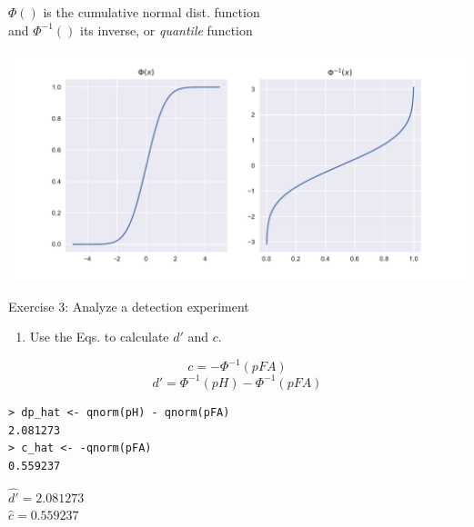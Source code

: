 \documentclass[10pt]{beamer}
\begin{document}
\begin{frame}{}
$\Phi()$ is the cumulative normal dist. function\\
and $\Phi^{-1}()$ its inverse, or \textit{quantile} function


\begin{center}
\includegraphics[scale=0.5]{figs/linkfun.pdf}
\end{center}
\end{frame}

\begin{frame}[fragile]{Exercise 3: Analyze a detection experiment}
\begin{enumerate}
\item Use the Eqs. to calculate $d'$ and $c$.
\end{enumerate}

\begin{block}{}
\begin{equation*}
c = -\Phi^{-1}(pFA)
\end{equation*}
\begin{equation*}
d'= \Phi^{-1}(pH) - \Phi^{-1}(pFA)
\end{equation*}
\end{block}

\pause
\begin{verbatim}
> dp_hat <- qnorm(pH) - qnorm(pFA)
2.081273
> c_hat <- -qnorm(pFA)
0.559237
\end{verbatim}

\begin{center}
$\hat{d'} = 2.081273$\\
$\hat{c} = 0.559237$
\end{center}

\end{frame}
\end{document}
